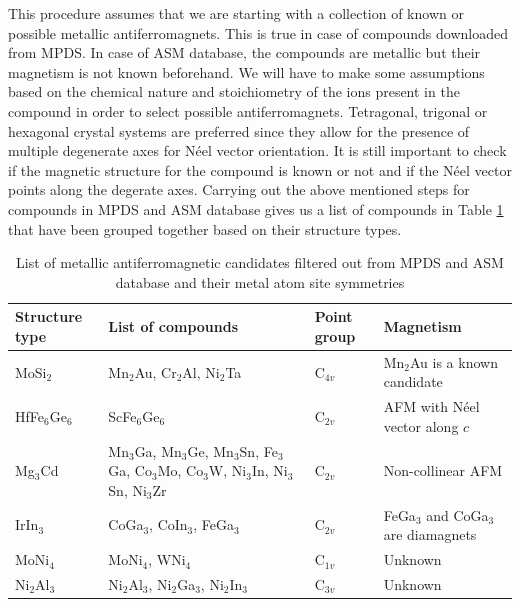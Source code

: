 \documentclass[10pt,doublespacing,edeposit]{uiucthesis2020}
\begin{document}
\begin{mainmatter}
This procedure assumes that we are starting with a collection of known or possible metallic antiferromagnets. This is true in case of compounds downloaded from MPDS. In case of ASM database, the compounds are metallic but their magnetism is not known beforehand. We will have to make some assumptions based on the chemical nature and stoichiometry of the ions present in the compound in order to select possible antiferromagnets. Tetragonal, trigonal or hexagonal crystal systems are preferred since they allow for the presence of multiple degenerate axes for N\'eel vector orientation. It is still important to check if the magnetic structure for the compound is known or not and if the N\'eel vector points along the degerate axes. Carrying out the above mentioned steps for compounds in MPDS and ASM database gives us a list of compounds  in Table \ref{tab:metallic_afm_candidates} that have been grouped together based on their structure types.

\renewcommand{\arraystretch}{1.2}
\begin{table}
\caption{\label{tab:metallic_afm_candidates} 
List of metallic antiferromagnetic candidates filtered out from MPDS and ASM database and their metal atom site symmetries}
\centering
\begin{tabular}{>{\raggedright\arraybackslash}p{3cm}>{\raggedright\arraybackslash}p{4cm}>{\centering}p{3cm}>{\raggedright\arraybackslash}p{4cm}}
\hline\hline
\textbf{Structure type} & \textbf{List of compounds} & \textbf{Point group} & \textbf{Magnetism}\\
\hline
MoSi$_2$ & Mn$_2$Au, Cr$_2$Al, Ni$_2$Ta & C$_{4v}$ & Mn$_2$Au is a known candidate\\
\hline
HfFe$_6$Ge$_6$ & ScFe$_6$Ge$_6$ & C$_{2v}$ & AFM with N\'eel vector along $c$\\
\hline
Mg$_3$Cd & Mn$_3$Ga, Mn$_3$Ge, Mn$_3$Sn, Fe$_3$Ga, Co$_3$Mo, Co$_3$W, Ni$_3$In, Ni$_3$Sn, Ni$_3$Zr & C$_{2v}$ & Non-collinear AFM\\
\hline
IrIn$_3$ & CoGa$_3$, CoIn$_3$, FeGa$_3$ & C$_{2v}$ & FeGa$_3$ and CoGa$_3$ are diamagnets\\
\hline
MoNi$_4$ & MoNi$_4$, WNi$_4$ & C$_{1v}$ & Unknown\\
\hline
Ni$_2$Al$_3$ & Ni$_2$Al$_3$, Ni$_2$Ga$_3$, Ni$_2$In$_3$ & C$_{3v}$ & Unknown\\
\hline\hline
\end{tabular}
~\\
\end{table}


\end{mainmatter}
\end{document}
